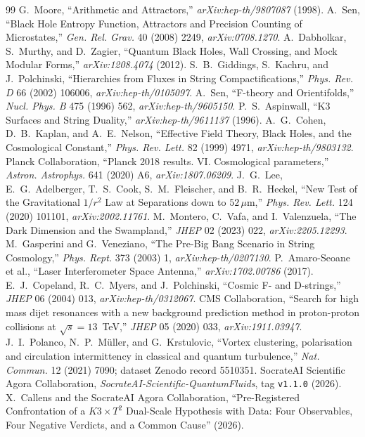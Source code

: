 \documentclass[11pt,a4paper]{article}
\theoremstyle{remark}
\begin{document}
\begin{thebibliography}{99}
 G.~Moore, ``Arithmetic and Attractors,'' \textit{arXiv:hep-th/9807087} (1998).
 A.~Sen, ``Black Hole Entropy Function, Attractors and Precision Counting of Microstates,''
  \textit{Gen. Rel. Grav.} 40 (2008) 2249, \textit{arXiv:0708.1270}.
 A.~Dabholkar, S.~Murthy, and D.~Zagier, ``Quantum Black Holes, Wall Crossing, and Mock Modular
  Forms,'' \textit{arXiv:1208.4074} (2012).
 S.~B.~Giddings, S.~Kachru, and J.~Polchinski, ``Hierarchies from Fluxes in String
  Compactifications,'' \textit{Phys. Rev. D} 66 (2002) 106006, \textit{arXiv:hep-th/0105097}.
 A.~Sen, ``F-theory and Orientifolds,'' \textit{Nucl. Phys. B} 475 (1996) 562,
  \textit{arXiv:hep-th/9605150}.
 P.~S.~Aspinwall, ``K3 Surfaces and String Duality,'' \textit{arXiv:hep-th/9611137} (1996).
 A.~G.~Cohen, D.~B.~Kaplan, and A.~E.~Nelson, ``Effective Field Theory, Black Holes, and the
  Cosmological Constant,'' \textit{Phys. Rev. Lett.} 82 (1999) 4971, \textit{arXiv:hep-th/9803132}.
 Planck Collaboration, ``Planck 2018 results. VI. Cosmological parameters,''
  \textit{Astron. Astrophys.} 641 (2020) A6, \textit{arXiv:1807.06209}.
 J.~G.~Lee, E.~G.~Adelberger, T.~S.~Cook, S.~M.~Fleischer, and B.~R.~Heckel,
  ``New Test of the Gravitational $1/r^2$ Law at Separations down to $52\,\mu$m,''
  \textit{Phys. Rev. Lett.} 124 (2020) 101101, \textit{arXiv:2002.11761}.
 M.~Montero, C.~Vafa, and I.~Valenzuela, ``The Dark Dimension and the Swampland,''
  \textit{JHEP} 02 (2023) 022, \textit{arXiv:2205.12293}.
 M.~Gasperini and G.~Veneziano, ``The Pre-Big Bang Scenario in String
  Cosmology,'' \textit{Phys. Rept.} 373 (2003) 1, \textit{arXiv:hep-th/0207130}.
 P.~Amaro-Seoane et al., ``Laser Interferometer Space Antenna,'' \textit{arXiv:1702.00786} (2017).
 E.~J.~Copeland, R.~C.~Myers, and J.~Polchinski, ``Cosmic F- and D-strings,''
  \textit{JHEP} 06 (2004) 013, \textit{arXiv:hep-th/0312067}.
 CMS Collaboration, ``Search for high mass dijet resonances with a new background prediction
  method in proton-proton collisions at $\sqrt{s}=13$~TeV,'' \textit{JHEP} 05 (2020) 033, \textit{arXiv:1911.03947}.
 J.~I.~Polanco, N.~P.~M\"uller, and G.~Krstulovic, ``Vortex clustering, polarisation and
  circulation intermittency in classical and quantum turbulence,'' \textit{Nat. Commun.} 12 (2021) 7090;
  dataset Zenodo record 5510351.
 SocrateAI Scientific Agora Collaboration, \textit{SocrateAI-Scientific-QuantumFluids},
  tag \texttt{v1.1.0} (2026).
 X.~Callens and the SocrateAI Agora Collaboration, ``Pre-Registered Confrontation of a
  $K3\times T^2$ Dual-Scale Hypothesis with Data: Four Observables, Four Negative Verdicts, and a Common Cause''
  (2026).
\end{thebibliography}
\end{document}

